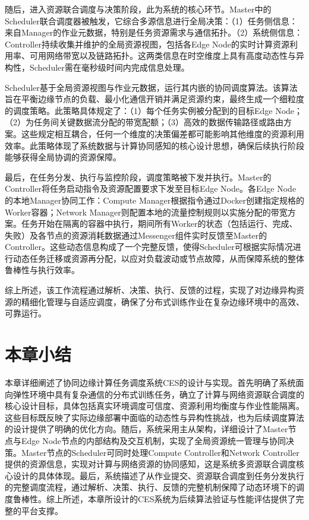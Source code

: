 随后，进入资源联合调度与决策阶段，此为系统的核心环节。Master中的Scheduler联合调度器被触发，它综合多源信息进行全局决策：（1）任务侧信息：来自Manager的作业元数据，特别是任务资源需求与通信拓扑。（2）系统侧信息：Controller持续收集并维护的全局资源视图，包括各Edge Node的实时计算资源利用率、可用网络带宽以及链路拓扑。这两类信息在时空维度上具有高度动态性与异构性，Scheduler需在毫秒级时间内完成信息处理。

Scheduler基于全局资源视图与作业元数据，运行其内嵌的协同调度算法。该算法旨在平衡边缘节点的负载、最小化通信开销并满足资源约束，最终生成一个细粒度的调度策略。此策略具体规定了：（1）每个任务实例被分配到的目标Edge Node；（2）为任务间关键数据流分配的带宽配额；（3）高效的数据传输路径或路由方案。这些规定相互耦合，任何一个维度的决策偏差都可能影响其他维度的资源利用效率。此策略体现了系统数据与计算协同感知的核心设计思想，确保后续执行阶段能够获得全局协调的资源保障。

最后，在任务分发、执行与监控阶段，调度策略被下发并执行。Master的Controller将任务启动指令及资源配置要求下发至目标Edge Node。各Edge Node的本地Manager协同工作：Compute Manager根据指令通过Docker创建指定规格的Worker容器；Network Manager则配置本地的流量控制规则以实施分配的带宽方案。任务开始在隔离的容器中执行，期间所有Worker的状态（包括运行、完成、失败）及各节点的资源消耗数据通过Messenger组件实时反馈至Master的Controller。这些动态信息构成了一个完整反馈，使得Scheduler可根据实际情况进行动态任务迁移或资源再分配，以应对负载波动或节点故障，从而保障系统的整体鲁棒性与执行效率。

综上所述，该工作流程通过解析、决策、执行、反馈的过程，实现了对边缘异构资源的精细化管理与自适应调度，确保了分布式训练作业在复杂边缘环境中的高效、可靠运行。

\section{本章小结}
本章详细阐述了协同边缘计算任务调度系统CES的设计与实现。首先明确了系统面向弹性环境中具有复杂通信的分布式训练任务，确立了计算与网络资源联合调度的核心设计目标，具体包括真实环境调度可信度、资源利用均衡度与作业性能隔离。这些目标既反映了实际边缘部署中面临的动态性与异构性挑战，也为后续调度算法的设计提供了明确的优化方向。随后，系统采用主从架构，详细设计了Master节点与Edge Node节点的内部结构及交互机制，实现了全局资源统一管理与协同决策。Master节点的Scheduler可同时处理Compute Controller和Network Controller提供的资源信息，实现对计算与网络资源的协同感知，这是系统多资源联合调度核心设计的具体体现。最后，系统描述了从作业提交、资源联合调度到任务分发执行的完整调度流程，通过解析、决策、执行、反馈的完整机制保障了动态环境下的调度鲁棒性。综上所述，本章所设计的CES系统为后续算法验证与性能评估提供了完整的平台支撑。